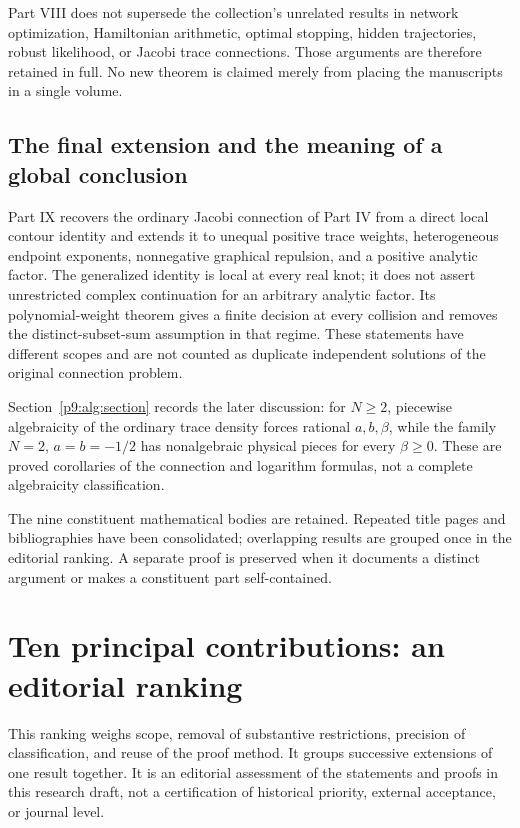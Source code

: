 \documentclass[11pt,a4paper]{article}
\theoremstyle{definition}
\theoremstyle{remark}
\numberwithin{equation}{section}
\begin{document}
Part VIII does not supersede the collection's unrelated results in
network optimization, Hamiltonian arithmetic, optimal stopping, hidden
trajectories, robust likelihood, or Jacobi trace connections. Those
arguments are therefore retained in full. No new theorem is claimed merely
from placing the manuscripts in a single volume.


\subsection*{The final extension and the meaning of a global conclusion}
Part IX recovers the ordinary Jacobi connection of Part IV from a direct
local contour identity and extends it to unequal positive trace weights,
heterogeneous endpoint exponents, nonnegative graphical repulsion, and a
positive analytic factor. The generalized identity is local at every
real knot; it does not assert unrestricted complex continuation for an
arbitrary analytic factor. Its polynomial-weight theorem gives a finite
decision at every collision and removes the distinct-subset-sum assumption
in that regime. These statements have different scopes and are not
counted as duplicate independent solutions of the original connection
problem.

Section~\ref{p9:alg:section} records the later discussion: for $N\ge2$,
piecewise algebraicity of the ordinary trace density forces rational
$a,b,\beta$, while the family $N=2$, $a=b=-1/2$ has nonalgebraic physical
pieces for every $\beta\ge0$. These are proved corollaries of the connection
and logarithm formulas, not a complete algebraicity classification.

The nine constituent mathematical bodies are retained. Repeated title
pages and bibliographies have been consolidated; overlapping results are
grouped once in the editorial ranking. A separate proof is preserved when
it documents a distinct argument or makes a constituent part self-contained.

\clearpage
\section*{Ten principal contributions: an editorial ranking}
This ranking weighs scope, removal of substantive restrictions, precision
of classification, and reuse of the proof method. It groups successive
extensions of one result together. It is an editorial assessment of the
statements and proofs in this research draft, not a certification of
historical priority, external acceptance, or journal level.
\end{document}
